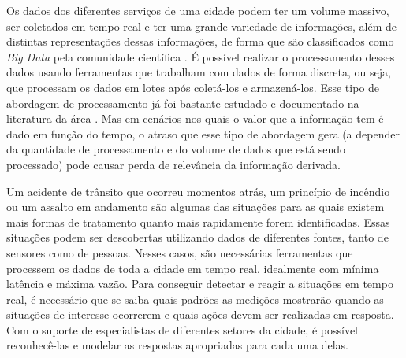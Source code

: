 
 
Os dados dos diferentes serviços de uma cidade podem ter um volume massivo, ser coletados em tempo real e ter uma grande variedade de informações, além de distintas representações dessas informações, de forma que são classificados como \textit{Big Data} pela comunidade científica \citep{DBLP:journals/corr/WardB13a}.
É possível realizar o processamento desses dados usando ferramentas que trabalham com dados de forma discreta, ou seja, que processam os dados em lotes após coletá-los e armazená-los. Esse tipo de abordagem de processamento já foi bastante estudado e documentado na literatura da área \citep{Dean:2010:MFD:1629175.1629198, DBLP:journals/corr/MoniruzzamanH13,computers3040117}.
Mas em cenários nos quais o valor que a informação tem é dado em função do tempo,
o atraso que esse tipo de abordagem gera (a depender da quantidade de processamento e do volume de dados que está sendo processado) pode causar perda de relevância da informação derivada.

Um acidente de trânsito que ocorreu momentos atrás, um princípio de incêndio ou um assalto em andamento são algumas das situações para as quais existem mais formas de tratamento quanto mais rapidamente forem identificadas. Essas situações podem ser descobertas utilizando dados de diferentes fontes, tanto de sensores como de pessoas. 
Nesses casos, são necessárias ferramentas que processem os dados de toda a cidade em tempo real, idealmente com mínima latência e máxima vazão. Para conseguir detectar e reagir a situações em tempo real, é necessário que se saiba quais padrões as medições mostrarão quando as situações de interesse ocorrerem e quais ações devem ser realizadas em resposta. Com o suporte de especialistas de diferentes setores da cidade, é possível reconhecê-las e modelar as respostas apropriadas para cada uma delas.




